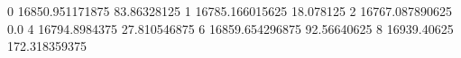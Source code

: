 0 16850.951171875 83.86328125
1 16785.166015625 18.078125
2 16767.087890625 0.0
4 16794.8984375 27.810546875
6 16859.654296875 92.56640625
8 16939.40625 172.318359375
